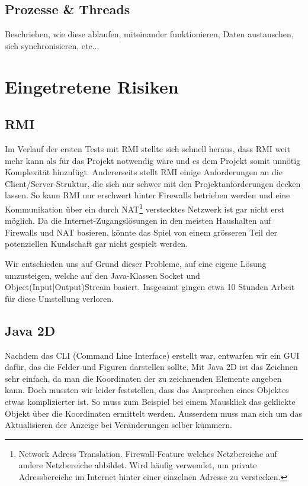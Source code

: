 \documentclass[a4paper,12pt,halfparskip,DIV14]{scrartcl}
\begin{document}
\subsection{Prozesse \& Threads} %
\label{sub:prozesse_threads}
Beschrieben, wie diese ablaufen, miteinander funktionieren, Daten austauschen, sich synchronisieren, etc...


\section{Eingetretene Risiken} %
\label{sec:risiken}

\subsection{RMI} %
\label{sub:rmi}

Im Verlauf der ersten Tests mit RMI stellte sich schnell heraus, dass RMI weit mehr kann als für das Projekt notwendig wäre und es dem Projekt somit unnötig Komplexität hinzufügt. Andererseits stellt RMI  einige Anforderungen an die Client/Server-Struktur, die sich nur schwer mit den Projektanforderungen decken lassen. So kann RMI nur erschwert hinter Firewalls betrieben werden und eine Kommunikation über ein durch NAT\footnote{Network Adress Translation. Firewall-Feature welches Netzbereiche auf andere Netzbereiche abbildet. Wird häufig verwendet, um private Adressbereiche im Internet hinter einer einzelnen Adresse zu verstecken.} verstecktes Netzwerk ist gar nicht erst möglich. Da die Internet-Zugangslösungen in den meisten Haushalten auf Firewalls und NAT basieren, könnte das Spiel von einem grösseren Teil der potenziellen Kundschaft gar nicht gespielt werden.

Wir entschieden uns auf Grund dieser Probleme, auf eine eigene Lösung umzusteigen, welche auf den Java-Klassen Socket und Object(Input|Output)Stream basiert. Insgesamt gingen etwa 10 Stunden Arbeit für diese Umstellung verloren.

\subsection{Java 2D} %
\label{sub:java_2d}

Nachdem das CLI (Command Line Interface) erstellt war, entwarfen wir ein GUI dafür, das die Felder und Figuren darstellen sollte. Mit Java 2D ist das Zeichnen sehr einfach, da man die Koordinaten der zu zeichnenden Elemente angeben kann. Doch mussten wir leider feststellen, dass das Ansprechen eines Objektes etwas komplizierter ist. So muss zum Beispiel bei einem Mausklick das geklickte Objekt über die Koordinaten ermittelt werden. Ausserdem muss man sich um das Aktualisieren der Anzeige bei Veränderungen selber kümmern.
\end{document}
